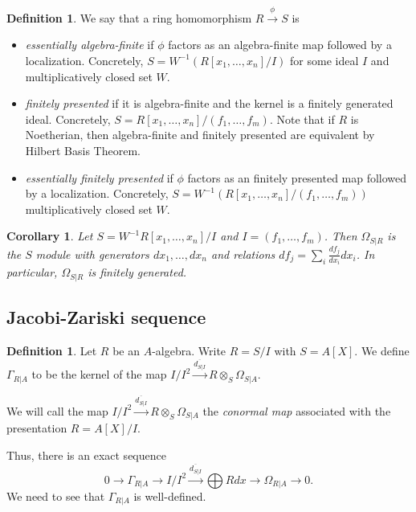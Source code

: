 \documentclass{amsart}[12pt]
\numberwithin{equation}{section}
\theoremstyle{plain} %
\newtheorem{cor}[equation]{Corollary}
\theoremstyle{definition}
\newtheorem{defn}[equation]{Definition}
\theoremstyle{remark}
\newcommand{\xra}[1]{\xrightarrow{#1}}
\begin{document}
\begin{defn} We say that a ring homomorphism $R\xra{\phi} S$ is
\begin{itemize}
\item \emph{essentially algebra-finite} if $\phi$ factors as an algebra-finite map followed by a localization. Concretely, $S=W^{-1} (R[x_1,\dots,x_n]/I)$ for some ideal $I$ and multiplicatively closed set $W$.
\item \emph{finitely presented} if it is algebra-finite and the kernel is a finitely generated ideal. Concretely, $S=R[x_1,\dots,x_n]/(f_1,\dots,f_m)$. Note that if $R$ is Noetherian, then algebra-finite and finitely presented are equivalent by Hilbert Basis Theorem.
\item \emph{essentially finitely presented} if $\phi$ factors as an finitely presented map followed by a localization. Concretely, $S=W^{-1} (R[x_1,\dots,x_n]/(f_1,\dots,f_m))$ multiplicatively closed set $W$.
\end{itemize}
\end{defn}

\begin{cor} Let $S=W^{-1}R[x_1,\dots,x_n]/I$ and $I=(f_1,\dots,f_m)$. Then $\Omega_{S|R}$ is the $S$ module with generators $dx_1,\dots,dx_n$ and relations $df_j = \sum_i \frac{d f_j}{dx_i} dx_i$. In particular, $\Omega_{S|R}$ is finitely generated.
\end{cor} 

\subsection{Jacobi-Zariski sequence}

\begin{defn}
Let $R$ be an $A$-algebra. Write $R=S/I$ with $S=A[X]$. We define
 $\Gamma_{R|A}$ to be the kernel of the map $I/I^2 \xra{\overline{d_{S|I}}} R\otimes_S \Omega_{S|A}$.
\end{defn}

We will call the map $I/I^2 \xra{\overline{d_{S|I}}} R\otimes_S \Omega_{S|A}$ the \emph{conormal map} associated with the presentation $R=A[X]/I$.

Thus, there is an exact sequence
\[ 0 \to \Gamma_{R|A} \to I/I^2 \xra{\overline{d_{S|I}}} \bigoplus R dx \to \Omega_{R|A} \to 0.\]
We need to see that $\Gamma_{R|A}$ is well-defined.
\end{document}
